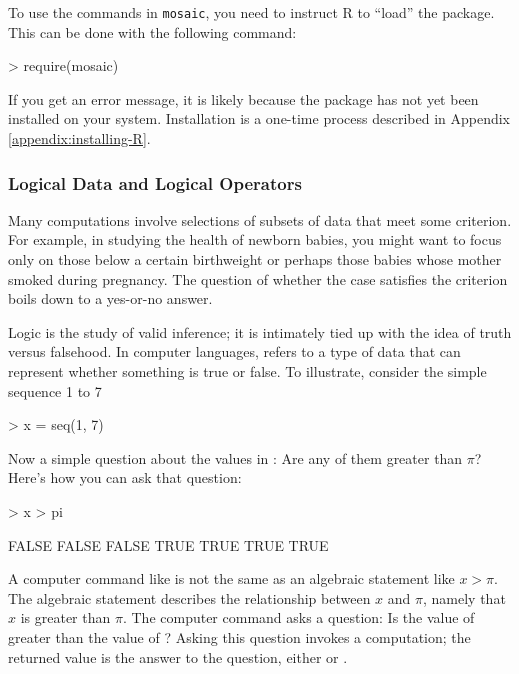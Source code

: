 To use the commands in \texttt{mosaic}, you need to instruct R to
``load'' the package.  This can be done with the following command:
\begin{Schunk}
\begin{Sinput}
> require(mosaic)
\end{Sinput}
\end{Schunk}



If you get an error message, it is likely because the package has not
yet been installed on your system.  Installation is a one-time process
described in Appendix \ref{appendix:installing-R}.


\subsubsection{Logical Data and Logical Operators}

Many computations involve selections of subsets of data that meet some
criterion.  For example, in studying the health of newborn babies, you
might want to focus only on those below a certain birthweight or
perhaps those babies whose mother smoked during pregnancy.  The
question of whether the case satisfies the criterion boils down to a
yes-or-no answer.

Logic is the study of valid inference; it is intimately tied up with
the idea of truth versus falsehood.  In computer languages,
 refers to a type of data that can represent
whether something is true or false.  To illustrate, consider the
simple sequence 1 to 7
\begin{Schunk}
\begin{Sinput}
> x = seq(1, 7)
\end{Sinput}
\end{Schunk}
Now a simple question about the values in : Are any of them
greater than $\pi$?  Here's how you can ask that question:
\begin{Schunk}
\begin{Sinput}
> x > pi
\end{Sinput}
\begin{Soutput}
[1] FALSE FALSE FALSE  TRUE  TRUE  TRUE  TRUE
\end{Soutput}
\end{Schunk}

A computer command like  is not the same as an
algebraic statement like $x > \pi$.  The algebraic statement describes
the relationship between $x$ and $\pi$, namely that $x$ is greater than
$\pi$.  The computer command asks a question: Is the value of
 greater than the value of ?  Asking this question
invokes a computation; the returned value is the answer to the
question, either  or .  

